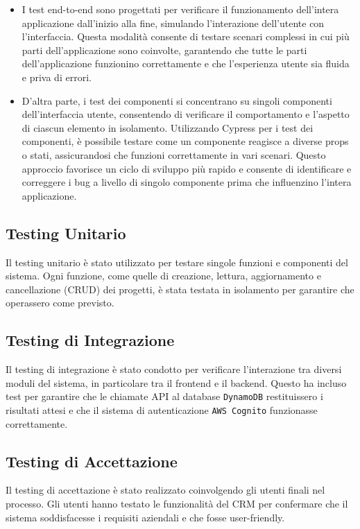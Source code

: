 \documentclass[target=bach,aauheader=,style=]{thud}
\begin{document}
\begin{itemize}
    \item I test end-to-end sono progettati per verificare il funzionamento dell'intera applicazione dall'inizio alla fine, simulando l'interazione dell'utente con l'interfaccia. Questa modalità consente di testare scenari complessi in cui più parti dell'applicazione sono coinvolte, garantendo che tutte le parti dell'applicazione funzionino correttamente e che l'esperienza utente sia fluida e priva di errori. 
    \item D'altra parte, i test dei componenti si concentrano su singoli componenti dell'interfaccia utente, consentendo di verificare il comportamento e l'aspetto di ciascun elemento in isolamento. Utilizzando Cypress per i test dei componenti, è possibile testare come un componente reagisce a diverse props o stati, assicurandosi che funzioni correttamente in vari scenari. Questo approccio favorisce un ciclo di sviluppo più rapido e consente di identificare e correggere i bug a livello di singolo componente prima che influenzino l'intera applicazione.
\end{itemize}

\subsection{Testing Unitario}
Il testing unitario è stato utilizzato per testare singole funzioni e componenti del sistema. Ogni funzione, come quelle di creazione, lettura, aggiornamento e cancellazione (CRUD) dei progetti, è stata testata in isolamento per garantire che operassero come previsto.

\subsection{Testing di Integrazione}
Il testing di integrazione è stato condotto per verificare l'interazione tra diversi moduli del sistema, in particolare tra il frontend e il backend. Questo ha incluso test per garantire che le chiamate API al database \texttt{DynamoDB} restituissero i risultati attesi e che il sistema di autenticazione \texttt{AWS Cognito} funzionasse correttamente.

\subsection{Testing di Accettazione}
Il testing di accettazione è stato realizzato coinvolgendo gli utenti finali nel processo. Gli utenti hanno testato le funzionalità del CRM per confermare che il sistema soddisfacesse i requisiti aziendali e che fosse user-friendly.
\end{document}
